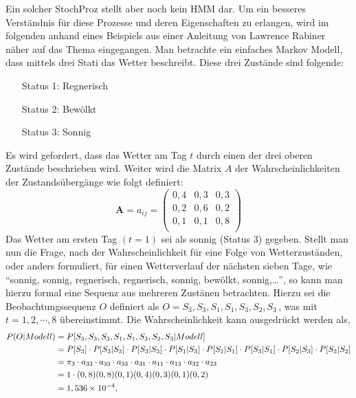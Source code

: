 Ein solcher \gls{StochProz} stellt aber noch kein \gls{HMM} dar.
\newline
Um ein besseres Verst\"andnis f\"ur diese Prozesse und deren Eigenschaften zu erlangen, wird im folgenden anhand eines Beispiels aus einer Anleitung von Lawrence Rabiner~\cite{bib:hmmrabiner} n\"aher auf das Thema eingegangen.
\newline
Man betrachte ein einfaches Markov Modell, dass mittels drei Stati das Wetter beschreibt. Diese drei Zust\"ande sind folgende:
\begin{itemize}
\item[Status 1:] Regnerisch
\item[Status 2:] Bew\"olkt
\item[Status 3:] Sonnig
\end{itemize}
Es wird gefordert, dass das Wetter am Tag $t$ durch einen der drei oberen Zust\"ande beschrieben wird. Weiter wird die Matrix $A$ der Wahrscheinlichkeiten der Zustands\"uberg\"ange wie folgt definiert:
\[
\label{E:MarkovProbMatrix}
\mathbf{A} = {a_{ij}} = 
\begin{pmatrix}
0,4 & 0,3 & 0,3 \\
0,2 & 0,6 & 0,2 \\
0,1 & 0,1 & 0,8 \\
\end{pmatrix}
\]
Das Wetter am ersten Tag $( t = 1)$ sei als sonnig (Status 3) gegeben. Stellt man nun die Frage, nach der Wahrscheinlichkeit f\"ur eine Folge von Wetterzust\"anden, oder anders formuliert, f\"ur einen Wetterverlauf der n\"achsten sieben Tage, wie \enquote{sonnig, sonnig, regnerisch, regnerisch, sonnig, bew\"olkt, sonnig,\ldots}, so kann man hierzu formal eine Sequenz aus mehreren Zust\"anen betrachten. Hierzu sei die Beobachtungssequenz $O$ definiert als $O = {S_3, S_3, S_1, S_1, S_3, S_2, S_3}\,$, was mit $t = 1, 2, \cdots, 8$ \"ubereinstimmt. Die Wahrscheinlichkeit kann ausgedr\"uckt werden als,
\begin{align}
P(O|Modell) &= P[S_3, S_3, S_3, S_1, S_1, S_3, S_2, S_3| Modell] \notag \\
 &= P[S_3] \cdot P[S_3|S_3] \cdot P[S_3|S_3] \cdot P[S_1|S_3] \cdot P[S_1|S_1] \cdot P[S_3|S_1] \cdot P[S_2|S_3] \cdot P[S_3|S_2] \notag \\
 &= \pi _3 \cdot a_{33} \cdot a_{33} \cdot a_{33} \cdot a_{31} \cdot a_{11} \cdot a_{13} \cdot a_{32} \cdot a_{23}\notag \\
 &= 1 \cdot (0,8) (0,8) (0,1) (0,4) (0,3) (0,1) (0,2)\notag\\ 
 &= 1,536 \times 10^{-4}, \notag
\end{align}
